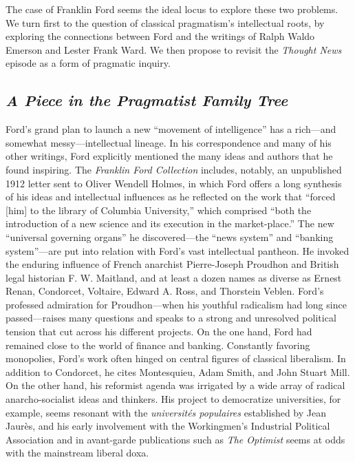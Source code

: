 \documentclass[twoside,symmetric,nobib,justified]{tufte-book}
\begin{document}
The case of Franklin Ford seems the ideal locus to explore these two
problems. We turn first to the question of classical pragmatism's
intellectual roots, by exploring the connections between Ford and the
writings of Ralph Waldo Emerson and Lester Frank Ward. We then propose
to revisit the \emph{Thought News} episode as a form of pragmatic
inquiry.

\hypertarget{a-piece-in-the-pragmatist-family-tree}{%
\subsection{\texorpdfstring{\emph{A Piece in the Pragmatist Family
Tree}}{A Piece in the Pragmatist Family Tree}}\label{a-piece-in-the-pragmatist-family-tree}}

Ford's grand plan to launch a new ``movement of intelligence'' has a
rich---and somewhat messy---intellectual lineage. In his correspondence
and many of his other writings, Ford explicitly mentioned the many ideas
and authors that he found inspiring. The \emph{Franklin Ford Collection}
includes, notably, an unpublished 1912 letter sent to Oliver Wendell
Holmes, in which Ford offers a long synthesis of his ideas and
intellectual influences as he reflected on the work that ``forced
{[}him{]} to the library of Columbia University,'' which comprised
``both the introduction of a new science and its execution in the
market-place.'' The new ``universal governing organs'' he
discovered---the ``news system'' and ``banking system''---are put into
relation with Ford's vast intellectual pantheon. He invoked the enduring
influence of French anarchist Pierre-Joseph Proudhon and British legal
historian F. W. Maitland, and at least a dozen names as diverse as
Ernest Renan, Condorcet, Voltaire, Edward A. Ross, and Thorstein Veblen.
Ford's professed admiration for Proudhon---when his youthful radicalism
had long since passed---raises many questions and speaks to a strong and
unresolved political tension that cut across his different projects. On
the one hand, Ford had remained close to the world of finance and
banking. Constantly favoring monopolies, Ford's work often hinged on
central figures of classical liberalism. In addition to Condorcet, he
cites Montesquieu, Adam Smith, and John Stuart Mill. On the other hand,
his reformist agenda was irrigated by a wide array of radical
anarcho-socialist ideas and thinkers. His project to democratize
universities, for example, seems resonant with the \emph{universités
populaires} established by Jean Jaurès, and his early involvement
with the Workingmen's Industrial Political Association and in
avant-garde publications such as \emph{The Optimist} seems at odds with
the mainstream liberal doxa.
\end{document}
